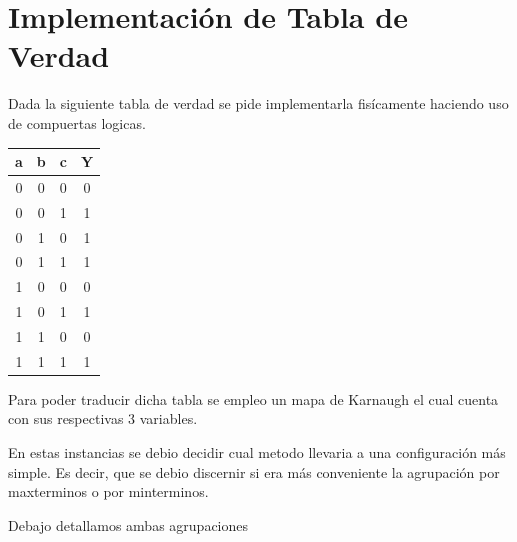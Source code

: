 \chapter{Implementación de Tabla de Verdad}

Dada la siguiente tabla de verdad se pide implementarla fisícamente haciendo uso de compuertas logicas.
\begin{center}
\begin{tabular}{ |c|c|c|c| } 
 \hline
 a & b & c & Y  \\ 
 \hline
 0 & 0 & 0 & 0 \\ 
 \hline
 0 & 0 & 1 & 1 \\ 
 \hline
 0 & 1 & 0 & 1 \\
 \hline
 0 & 1 & 1 & 1 \\
 \hline
 1 & 0 & 0 & 0 \\
 \hline
 1 & 0 & 1 & 1 \\
 \hline
 1 & 1 & 0 & 0 \\
 \hline
 1 & 1 & 1 & 1\\
 \hline 
\end{tabular}
\end{center}
Para poder traducir dicha tabla se empleo un mapa de Karnaugh el cual cuenta con sus respectivas 3 variables.
\begin{center}
 	\begin{Karnaughvuit}
	\end{Karnaughvuit}
\end{center}
En estas instancias se debio decidir cual metodo llevaria a una configuración más simple. Es decir, que se debio discernir si era más conveniente la agrupación por maxterminos o por minterminos.

Debajo detallamos ambas agrupaciones
\begin{center}
 	\begin{Karnaughvuit}
		\minterms{1,3,2,5}
	\end{Karnaughvuit}
\end{center}

